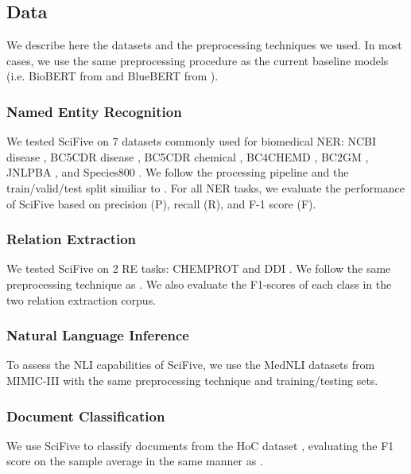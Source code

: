 \documentclass[nocrop]{bioinfo}
\begin{document}
\subsection{Data}
We describe here the datasets and the preprocessing techniques we used. In most cases, we use the same preprocessing procedure as the current baseline models (i.e. BioBERT from \cite{DBLP:journals/corr/abs-1901-08746} and BlueBERT from \cite{DBLP:journals/corr/abs-1906-05474}).

\subsubsection{Named Entity Recognition}
We tested SciFive on 7 datasets commonly used for biomedical NER: NCBI disease \citep{doan2014disease}, BC5CDR disease \citep{article_li}, BC5CDR chemical \citep{article_li}, BC4CHEMD \citep{article_krallinger}, BC2GM \citep{article_smith}, JNLPBA \citep{collier-kim-2004-introduction}, and Species800 \cite{Pafilis2013TheSA}. We follow the processing pipeline and the train/valid/test split similiar to \cite{DBLP:journals/corr/abs-1901-08746}. For all NER tasks, we evaluate the performance of SciFive based on precision (P), recall (R), and F-1 score (F).

\subsubsection{Relation Extraction}
We tested SciFive on 2 RE tasks: CHEMPROT \citep{10.1093/database/bay147} and DDI \citep{HERREROZAZO2013914}. We follow the same preprocessing technique as \cite{DBLP:journals/corr/abs-1906-05474}. We also evaluate the F1-scores of each class in the two relation extraction corpus.
\subsubsection{Natural Language Inference}
To assess the NLI capabilities of SciFive, we use the MedNLI datasets from MIMIC-III \citep{romanov-shivade-2018-lessons} with the same preprocessing technique and training/testing sets.

\subsubsection{Document Classification}
We use SciFive to classify documents from the HoC dataset \citep{10.1093/bioinformatics/btv585}, evaluating the F1 score on the sample average in the same manner as \cite{10.1093/bioinformatics/btx659}.
\end{document}
